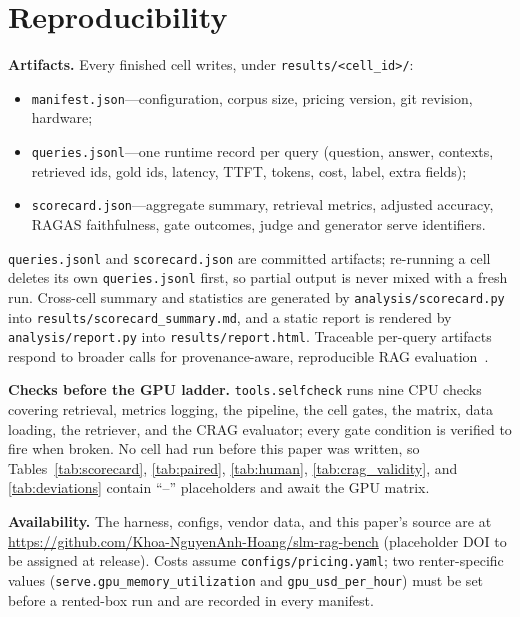 
\section{Reproducibility}
\label{sec:repro}

\textbf{Artifacts.}
Every finished cell writes, under \texttt{results/<cell\_id>/}:

\begin{itemize}
    \item \texttt{manifest.json}---configuration, corpus size, pricing
          version, git revision, hardware;
    \item \texttt{queries.jsonl}---one runtime record per query
          (question, answer, contexts, retrieved ids, gold ids, latency,
          TTFT, tokens, cost, label, extra fields);
    \item \texttt{scorecard.json}---aggregate summary, retrieval metrics,
          adjusted accuracy, RAGAS faithfulness, gate outcomes, judge and
          generator serve identifiers.
\end{itemize}

\texttt{queries.jsonl} and \texttt{scorecard.json} are committed
artifacts; re-running a cell deletes its own \texttt{queries.jsonl}
first, so partial output is never mixed with a fresh run. Cross-cell
summary and statistics are generated by
\texttt{analysis/scorecard.py} into
\texttt{results/scorecard\_summary.md}, and a static report is rendered by
\texttt{analysis/report.py} into \texttt{results/report.html}. Traceable
per-query artifacts respond to broader calls for provenance-aware,
reproducible RAG evaluation~\cite{brown2025systematic,murugaraj2025ragvue,saadfalcon2023ares,sharma2025survey}.

\textbf{Checks before the GPU ladder.}
\texttt{tools.selfcheck} runs nine CPU checks covering retrieval,
metrics logging, the pipeline, the cell gates, the matrix, data loading,
the retriever, and the CRAG evaluator; every gate condition is verified
to fire when broken. No cell had run before this paper was written, so
Tables~\ref{tab:scorecard}, \ref{tab:paired}, \ref{tab:human},
\ref{tab:crag_validity}, and \ref{tab:deviations} contain ``--''
placeholders and await the GPU matrix.

\textbf{Availability.}
The harness, configs, vendor data, and this paper's source are at
\url{https://github.com/Khoa-NguyenAnh-Hoang/slm-rag-bench}
(placeholder DOI to be assigned at release). Costs assume
\texttt{configs/pricing.yaml}; two renter-specific values
(\texttt{serve.gpu\_memory\_utilization} and
\texttt{gpu\_usd\_per\_hour}) must be set before a rented-box run and are
recorded in every manifest.
